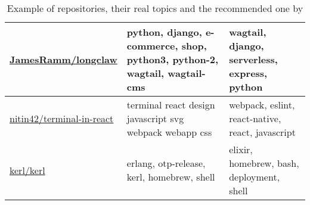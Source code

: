 \begin{table*}[]
\begin{tabular}{|p{3.8cm} | p{5.2cm} | p{3.2cm} |}
		\href{https://github.com/JamesRamm/longclaw}{JamesRamm/longclaw}                           & python, django, e-commerce, shop, python3, python-2, wagtail, wagtail-cms                                                                & wagtail, django, serverless, express, python \\ \hline
		\href{https://github.com/nitin42/terminal-in-react}{nitin42/terminal-in-react}             & terminal react	design javascript svg webpack webapp css                                                                           & webpack, eslint, react-native, react,  javascript                                                  \\ \hline
		\href{https://github.com/kerl/kerl}{kerl/kerl}                                             & erlang, otp-release, kerl, homebrew, shell  & elixir, homebrew, bash,  deployment, 	shell  \\ \hline
	\end{tabular}
	\caption{Example of repositories, their real topics and the recommended one by \MNB}
	\label{tab:motivation_example}
\end{table*} 